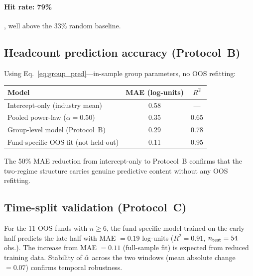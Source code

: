\paragraph{Hit rate: 79\%}, well above the 33\% random baseline.

\subsection{Headcount prediction accuracy (Protocol~B)}

Using Eq.~\eqref{eq:group_pred}---in-sample group parameters,
no OOS refitting:
\begin{center}
\begin{tabular}{lcc}
\toprule
Model & MAE (log-units) & $R^2$ \\
\midrule
Intercept-only (industry mean)     & 0.58 & --- \\
Pooled power-law ($\alpha = 0.50$) & 0.35 & 0.65 \\
Group-level model (Protocol~B)     & 0.29 & 0.78 \\
\midrule
Fund-specific OOS fit (not held-out) & 0.11 & 0.95 \\
\bottomrule
\end{tabular}
\end{center}
The 50\% MAE reduction from intercept-only to Protocol~B confirms
that the two-regime structure carries genuine predictive content
without any OOS refitting.

\subsection{Time-split validation (Protocol~C)}

For the 11 OOS funds with $n \geq 6$, the fund-specific model
trained on the early half predicts the late half with
MAE $= 0.19$ log-units ($R^2 = 0.91$, $n_{\rm test} = 54$ obs.).
The increase from MAE $= 0.11$ (full-sample fit) is expected
from reduced training data.
Stability of $\hat{\alpha}$ across the two windows (mean absolute
change $= 0.07$) confirms temporal robustness.

